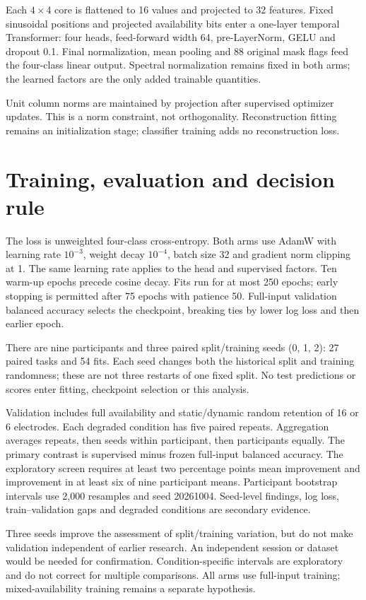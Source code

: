\documentclass[11pt,a4paper]{article}
\begin{document}
Each $4\times4$ core is flattened to 16 values and projected to 32 features.
Fixed sinusoidal positions and projected availability bits enter a one-layer
temporal Transformer: four heads, feed-forward width 64, pre-LayerNorm, GELU
and dropout 0.1. Final normalization, mean pooling and 88 original mask flags
feed the four-class linear output. Spectral normalization remains fixed in both
arms; the learned factors are the only added trainable quantities.

Unit column norms are maintained by projection after supervised optimizer
updates. This is a norm constraint, not orthogonality. Reconstruction fitting
remains an initialization stage; classifier training adds no reconstruction loss.

\section{Training, evaluation and decision rule}
The loss is unweighted four-class cross-entropy. Both arms use AdamW with
learning rate $10^{-3}$, weight decay $10^{-4}$, batch size 32 and gradient norm
clipping at 1. The same learning rate applies to the head and supervised factors.
Ten warm-up epochs precede cosine decay. Fits run for at most 250 epochs;
early stopping is permitted after 75 epochs with patience 50. Full-input
validation balanced accuracy selects the checkpoint, breaking ties by lower
log loss and then earlier epoch.

There are nine participants and three paired split/training seeds (0, 1, 2):
27 paired tasks and 54 fits. Each seed changes both the historical split and
training randomness; these are not three restarts of one fixed split. No test
predictions or scores enter fitting, checkpoint selection or this analysis.

Validation includes full availability and static/dynamic random retention of
16 or 6 electrodes. Each degraded condition has five paired repeats. Aggregation
averages repeats, then seeds within participant, then participants equally.
The primary contrast is supervised minus frozen full-input balanced accuracy.
The exploratory screen requires at least two percentage points mean improvement
and improvement in at least six of nine participant means. Participant bootstrap
intervals use 2,000 resamples and seed 20261004. Seed-level findings, log loss,
train--validation gaps and degraded conditions are secondary evidence.

Three seeds improve the assessment of split/training variation, but do not make
validation independent of earlier research. An independent session or dataset
would be needed for confirmation. Condition-specific intervals are exploratory
and do not correct for multiple comparisons. All arms use full-input training;
mixed-availability training remains a separate hypothesis.
\end{document}
